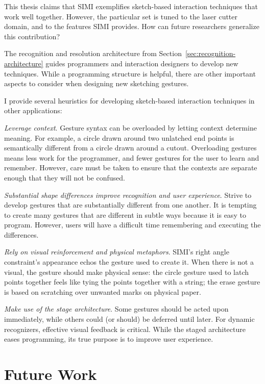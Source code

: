 This thesis claims that SIMI exemplifies sketch-based interaction
techniques that work well together. However, the particular set is
tuned to the laser cutter domain, and to the features SIMI
provides. How can future researchers generalize this contribution?

The recognition and resolution architecture from
Section~\ref{sec:recognition-architecture} guides programmers and
interaction designers to develop new techniques. While a programming
structure is helpful, there are other important aspects to consider
when designing new sketching gestures.

I provide several heuristics for developing sketch-based interaction
techniques in other applications:

\textit{Leverage context}. Gesture syntax can be overloaded by letting
context determine meaning. For example, a circle drawn around two
unlatched end points is semantically different from a circle drawn
around a cutout. Overloading gestures means less work for the
programmer, and fewer gestures for the user to learn and
remember. However, care must be taken to ensure that the contexts are
separate enough that they will not be confused.

\textit{Substantial shape differences improve recognition and user
  experience}. Strive to develop gestures that are substantially
different from one another. It is tempting to create many gestures
that are different in subtle ways because it is easy to
program. However, users will have a difficult time remembering and
executing the differences.

\textit{Rely on visual reinforcement and physical metaphors}. SIMI's
right angle constraint's appearance echos the gesture used to create
it. When there is not a visual, the gesture should make physical
sense: the circle gesture used to latch points together feels like
tying the points together with a string; the erase gesture is based on
scratching over unwanted marks on physical paper.

\textit{Make use of the stage architecture}. Some gestures should be
acted upon immediately, while others could (or should) be deferred
until later. For dynamic recognizers, effective visual feedback is
critical. While the staged architecture eases programming, its true
purpose is to improve user experience.




\section{Future Work}

